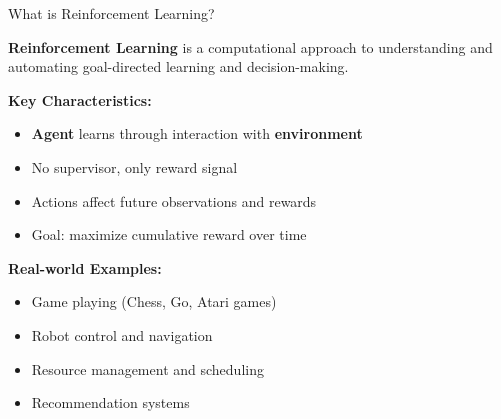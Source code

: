 \documentclass[aspectratio=169,10pt]{beamer}
\begin{document}
\begin{frame}{What is Reinforcement Learning?}

\textbf{Reinforcement Learning} is a computational approach to understanding and automating goal-directed learning and decision-making.

\vfill

\textbf{Key Characteristics:}
\begin{itemize}
    \item \textbf{Agent} learns through interaction with \textbf{environment}
    \item No supervisor, only reward signal
    \item Actions affect future observations and rewards
    \item Goal: maximize cumulative reward over time
\end{itemize}

\vfill

\textbf{Real-world Examples:}
\begin{itemize}
    \item Game playing (Chess, Go, Atari games)
    \item Robot control and navigation
    \item Resource management and scheduling
    \item Recommendation systems
\end{itemize}

\end{frame}
\end{document}
